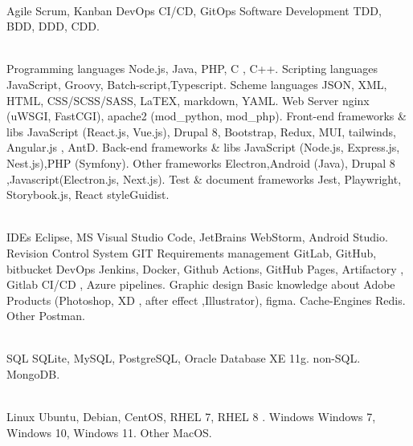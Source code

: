 


\begin{cvskills}

  \\

  \cvskill
    {Agile}
    {Scrum, Kanban}
  \cvskill
    {DevOps}
    {CI/CD, GitOps}
  \cvskill
    {Software Development}
    {TDD, BDD, DDD, CDD.}

  \\

  \cvskill
    {Programming languages}
    {Node.js, Java, PHP, C , C++.}
  \cvskill
    {Scripting languages}
    {JavaScript, Groovy, Batch-script,Typescript.}
  \cvskill
    {Scheme languages}
    {JSON, XML, HTML, CSS/SCSS/SASS, LaTEX, markdown, YAML.}
  \cvskill
    {Web Server}
    {nginx (uWSGI, FastCGI), apache2 (mod\_python, mod\_php).}
  \cvskill
    {Front-end frameworks \& libs}
    {JavaScript (React.js, Vue.js), Drupal 8, Bootstrap, Redux, MUI, tailwinds, Angular.js , AntD.}
  \cvskill
    {Back-end frameworks \& libs}
    {JavaScript (Node.js, Express.js, Nest.js),PHP (Symfony).}
  \cvskill
    {Other frameworks}
    {Electron,Android (Java), Drupal 8 ,Javascript(Electron.js, Next.js).}
  \cvskill
    {Test \& document frameworks}
    {Jest, Playwright, Storybook.js, React styleGuidist.}

  \\

    \cvskill
      {IDEs}
      {Eclipse, MS Visual Studio Code, JetBrains WebStorm, Android Studio.}
    \cvskill
      {Revision Control System}
      {GIT}
    \cvskill
      {Requirements management}
      {GitLab, GitHub, bitbucket}
    \cvskill
      {DevOps}
      {Jenkins, Docker, Github Actions, GitHub Pages, Artifactory , Gitlab CI/CD , Azure pipelines.}
    \cvskill
      {Graphic design}
      {Basic knowledge about Adobe Products (Photoshop, XD , after effect ,Illustrator), figma.}
    \cvskill
      {Cache-Engines}
      {Redis.}
    \cvskill
      {Other}
      {Postman.}

  \\

    \cvskill
        {SQL}
        {SQLite, MySQL, PostgreSQL, Oracle Database XE 11g.}
    \cvskill
        {non-SQL.}
        {MongoDB.}

\end{cvskills}
\begin{cvskills}

  \\

    \cvskill
        {Linux}
        {Ubuntu, Debian, CentOS, RHEL 7, RHEL 8 .}
    \cvskill
        {Windows}
        {Windows 7, Windows 10, Windows 11.}
    \cvskill
        {Other}
        {MacOS.}
\end{cvskills}
